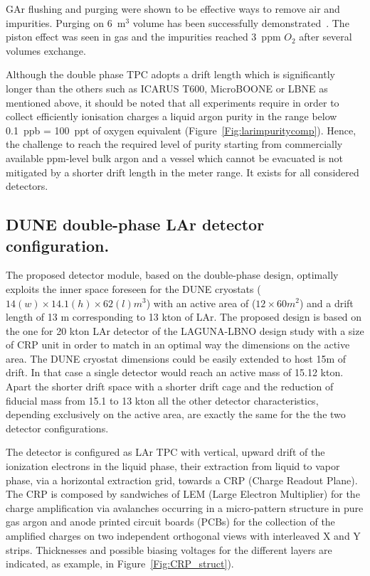 GAr flushing and purging were shown to be effective ways to remove air and impurities. Purging on 6~m$^3$ volume has been successfully demonstrated~\cite{Curioni:2010gd}. The piston effect was seen in gas and the impurities reached 3~ppm $O_2$ after several volumes exchange.

Although the double phase TPC adopts a drift length which is significantly longer than the others such as ICARUS T600, MicroBOONE or LBNE as mentioned above, it should be noted that all experiments require in order to collect efficiently ionisation charges a liquid argon purity
in the range below 0.1~ppb = 100~ppt of oxygen equivalent (Figure~\ref{Fig:larimpuritycomp}).  Hence, the challenge to reach the required level of purity starting from commercially available ppm-level bulk argon and a vessel which cannot be evacuated  is not mitigated by a shorter drift length in the meter range. It exists for all considered detectors.

\subsection{ DUNE double-phase LAr detector configuration.}

The proposed detector module, based on the double-phase design, optimally exploits the inner space foreseen for the DUNE cryostats ($14 (w) \times 14.1 (h) \times 62  (l) m^3$) with an active area of  ($12 \times 60 m^2$) and a drift length of 13 m corresponding to 13 kton of LAr. The proposed design is based on the one for 20 kton LAr detector of the LAGUNA-LBNO design study with a size of CRP unit in order to match in an optimal way the dimensions on the active area. The DUNE cryostat dimensions could be easily extended to host 15m of drift. In that case a single detector would reach an active mass of 15.12 kton.  Apart the shorter drift space with a shorter drift cage and the reduction of fiducial mass from 15.1 to 13 kton all the other detector characteristics, depending exclusively on the active area, are exactly the same for the the two detector configurations.

The detector is configured as LAr TPC with vertical, upward drift of the ionization electrons in the liquid phase, their extraction from liquid to vapor phase, via a horizontal extraction grid, towards a CRP (Charge Readout Plane). The CRP is composed by sandwiches of LEM (Large Electron Multiplier) for the charge amplification via avalanches occurring in a micro-pattern structure in pure gas argon and anode printed circuit boards (PCBs) for  the collection of the amplified charges on two independent orthogonal views with interleaved X and Y strips. Thicknesses and possible biasing voltages for the different layers are indicated, as example, in Figure~\ref{Fig:CRP_struct}). 

